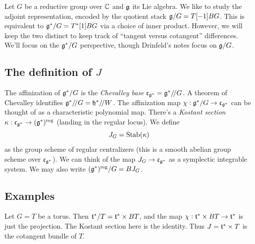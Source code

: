 \documentclass{article}
\begin{document}
Let $G$ be a reductive group over $\mathbb{C}$ and $\mathfrak{g}$ its Lie algebra.
We like to study the adjoint representation, encoded by the quotient stack $\mathfrak{g} / G = T[-1] BG$.
This is equivalent to $\mathfrak{g}^* / G = T^*[1] BG$ via a choice of inner product.
However, we will keep the two distinct to keep track of ``tangent versus cotangent'' differences.
We'll focus on the $\mathfrak{g}^* / G$ perspective, though Drinfeld's notes focus on $\mathfrak{g} / G$.

\subsection{The definition of $J$}

The affinization of $\mathfrak{g}^* / G$ is the \emph{Chevalley base} $\mathfrak{c}_{\mathfrak{g}^*} = \mathfrak{g}^* /\mkern-3mu/ G$.
A theorem of Chevalley identifies $\mathfrak{g}^* /\mkern-3mu/ G = \mathfrak{h}^* /\mkern-3mu/ W$.
The affinization map $\chi: \mathfrak{g}^* / G \to \mathfrak{c}_{\mathfrak{g}^*}$ can be thought of as a characteristic polynomial map.
There's a \emph{Kostant section} $\kappa: \mathfrak{c}_{\mathfrak{g}^*} \to (\mathfrak{g}^*)^{\mathrm{reg}}$ (landing in the regular locus).
We define
\[
  J_G = \operatorname{Stab}(\kappa)
\]
as the group scheme of regular centralizers (this is a smooth abelian group scheme over $\mathfrak{c}_{\mathfrak{g}^*}$).
We can think of the map $J_G \to \mathfrak{c}_{\mathfrak{g}^*}$ as a symplectic integrable system.
We may also write $(\mathfrak{g}^*)^{\mathrm{reg}} / G = BJ_G$.

\subsection{Examples}

\begin{ex}
  Let $G = T$ be a torus.
  Then $\mathfrak{t}^* / T = \mathfrak{t}^* \times BT$, and the map $\chi: \mathfrak{t}^* \times BT \to \mathfrak{t}^*$ is just the projection.
  The Kostant section here is the identity.
  Thus $J = \mathfrak{t}^* \times T$ is the cotangent bundle of $T$.
\end{ex}
\end{document}
